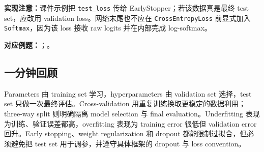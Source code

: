 \textbf{实现注意：}课件示例把 \texttt{test\_loss} 传给 EarlyStopper；若该数据真是最终 test set，应改用 validation loss。网络末尾也不应在 \texttt{CrossEntropyLoss} 前显式加入 \texttt{Softmax}，因为该 loss 接收 raw logits 并在内部完成 log-softmax。

\textbf{对应例题：}；。

\subsection{一分钟回顾}

Parameters 由 training set 学习，hyperparameters 由 validation set 选择，test set 只做一次最终评估。Cross-validation 用重复训练换取更稳定的数据利用；three-way split 则明确隔离 model selection 与 final evaluation。Underfitting 表现为训练、验证误差都高，overfitting 表现为 training error 很低但 validation error 回升。Early stopping、weight regularization 和 dropout 都能限制过拟合，但必须避免把 test set 用于调参，并遵守具体框架的 dropout 与 loss convention。
